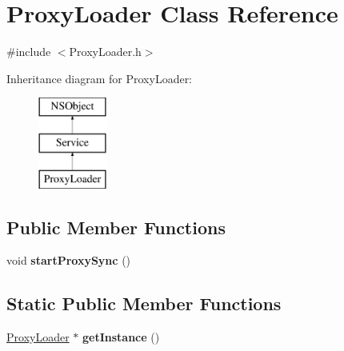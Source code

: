 \hypertarget{interface_proxy_loader}{
\section{\-Proxy\-Loader \-Class \-Reference}
\label{interface_proxy_loader}
}


{\ttfamily \#include $<$\-Proxy\-Loader.\-h$>$}

\-Inheritance diagram for \-Proxy\-Loader\-:\begin{figure}[H]
\begin{center}
\leavevmode
\includegraphics[height=3.000000cm]{interface_proxy_loader}
\end{center}
\end{figure}
\subsection*{\-Public \-Member \-Functions}
\begin{DoxyCompactItemize}
\item 
\hypertarget{interface_proxy_loader_a25ade6b11f7637d1b5200cbfa86f266b}{
void {\bfseries start\-Proxy\-Sync} ()}
\label{interface_proxy_loader_a25ade6b11f7637d1b5200cbfa86f266b}

\end{DoxyCompactItemize}
\subsection*{\-Static \-Public \-Member \-Functions}
\begin{DoxyCompactItemize}
\item 
\hypertarget{interface_proxy_loader_a8ed83d004fa4d99adae1dd7e8e653649}{
\hyperlink{interface_proxy_loader}{\-Proxy\-Loader} $\ast$ {\bfseries get\-Instance} ()}
\label{interface_proxy_loader_a8ed83d004fa4d99adae1dd7e8e653649}

\end{DoxyCompactItemize}


